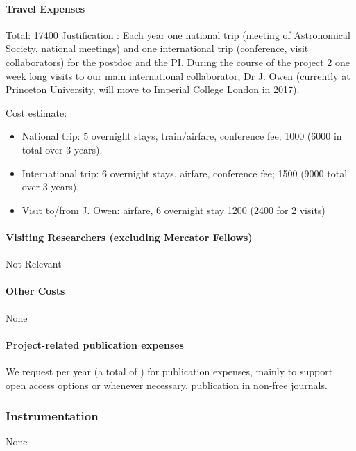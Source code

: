 \documentclass[10pt,fleqn,twoside]{article}
\begin{document}
\paragraph{Travel Expenses}

Total: 17400 \EUR{} Justification : 
Each year one national trip (meeting of Astronomical Society, national
meetings) and one international trip (conference, visit
collaborators) for the postdoc and the PI. 
During the course of the project 2 one week long visits to our main
international collaborator, Dr J. Owen (currently at Princeton
University, will move to Imperial College London in 2017).

Cost estimate: 
\begin{itemize}
\item National trip: 5 overnight stays, train/airfare,
conference fee; 1000 \EUR{} (6000 in total over 3 years).
\item International trip: 6 overnight stays, airfare, conference fee;
  1500 \EUR{} (9000 total over 3 years).
\item Visit to/from J. Owen: airfare, 6 overnight stay 1200 \EUR{} (2400
  for 2 visits)
\end{itemize}

\paragraph{Visiting Researchers (excluding Mercator Fellows)}

Not Relevant 

\paragraph{Other Costs}

None

\paragraph{Project-related publication expenses}

We request  per year (a total of ) for publication
expenses, mainly to support open access options or whenever necessary,
publication in non-free journals.

\subsubsection{Instrumentation}

None 
\end{document}
